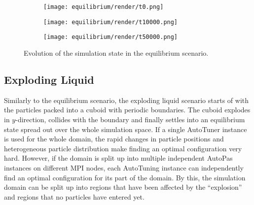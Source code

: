 \begin{figure}[htpb]
	\centering
	\begin{subfigure}[c]{.3\textwidth}
		\texttt{[image: equilibrium/render/t0.png]}
	\end{subfigure}%
	\begin{subfigure}[c]{.3\textwidth}
		\texttt{[image: equilibrium/render/t10000.png]}
	\end{subfigure}%
	\begin{subfigure}[c]{.3\textwidth}
		\texttt{[image: equilibrium/render/t50000.png]}
	\end{subfigure}%
	\hfill\begin{subfigure}[c]{.08\textwidth}
	\end{subfigure}
	\label{fig:evolution_equil}
	\caption{Evolution of the simulation state in the equilibrium scenario.}
\end{figure}


\subsection{Exploding Liquid}
Similarly to the equilibrium scenario, the exploding liquid scenario starts of with the particles packed into a cuboid with periodic boundaries. The cuboid explodes in $y$-direction, collides with the boundary and finally settles into an equilibrium state spread out over the whole simulation space. If a single AutoTuner instance is used for the whole domain, the rapid changes in particle positions and heterogeneous particle distribution make finding an optimal configuration very hard. However, if the domain is split up into multiple independent AutoPas instances on different MPI nodes, each AutoTuning instance can independently find an optimal configuration for its part of the domain. By this, the simulation domain can be split up into regions that have been affected by the \enquote{explosion} and regions that no particles have entered yet.

